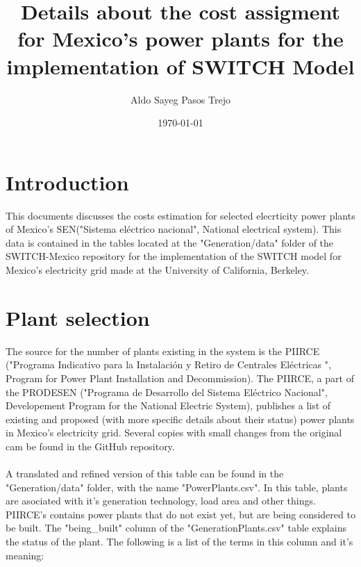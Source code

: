 \documentclass[letterpaper,12pt]{article}
\title{Details about the cost assigment for Mexico's power plants for the implementation of SWITCH Model}
\author[1,2]{Aldo Sayeg Pasos Trejo}
\affil[1]{\textit{Physics Departament. Facultad de Ciencias. Universidad Nacional Autonoma de Mexico}}
\affil[2]{\textit{Visiting Student Researcher for the Berkeley Energy and Climate Institute at University of California, Berkeley}}
\date{\today}
\begin{document}
\maketitle
\section{Introduction}
This documents discusses the costs estimation for selected elecrticity power plants of Mexico's SEN("Sistema eléctrico nacional", National electrical system). This data is contained in the tables located at the "Generation/data" folder of the SWITCH-Mexico repository\cite{repo} for the implementation of the SWITCH model for Mexico's electricity grid made at the University of California, Berkeley.
\section{Plant selection}
The source for the number of plants existing in the system is the PIIRCE ("Programa Indicativo para la Instalación y Retiro de Centrales Eléctricas ", Program for Power Plant Installation and Decommission). The PIIRCE, a part of the PRODESEN ("Programa de Desarrollo del Sistema Eléctrico Nacional", Developement Program for the National Electric System), publishes a list\cite{piirce} of existing and proposed (with more specific details about their status) power plants in Mexico's electricity grid. Several copies with small changes from the original cam be found in the GitHub repository.
\\
\\ A translated and refined version of this table can be found in the "Generation/data" folder, with the name "PowerPlants.csv". In this table, plants are asociated with it's generation technology, load area and other things. PIIRCE's contains power plants that do not exist yet, but are being considered to be built. The "being\_built" column of the "GenerationPlants.csv" table explains the status of the plant. The following is a list of the terms in this column and it's meaning:
\end{document}
